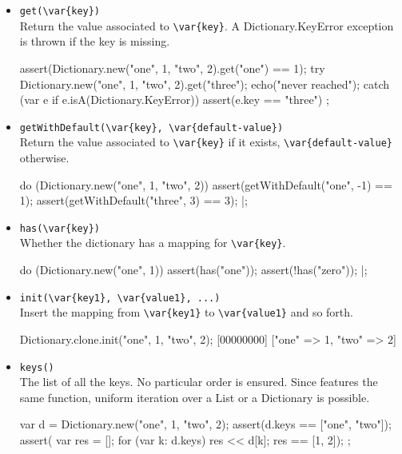 \begin{itemize}
\item \lstinline|get(\var{key})|\\
  Return the value associated to \lstinline|\var{key}|.  A
  Dictionary.KeyError exception is thrown if the key is missing.

\begin{urbiscript}
assert(Dictionary.new("one", 1, "two", 2).get("one") == 1);
try
{
  Dictionary.new("one", 1, "two", 2).get("three");
  echo("never reached");
}
catch (var e if e.isA(Dictionary.KeyError))
{
  assert(e.key == "three")
};
\end{urbiscript}


\item \lstinline|getWithDefault(\var{key}, \var{default-value})|\\
  Return the value associated to  \lstinline|\var{key}| if it exists,
  \lstinline|\var{default-value}| otherwise.

\begin{urbiscript}
do (Dictionary.new("one", 1, "two", 2))
{
  assert(getWithDefault("one",  -1) == 1);
  assert(getWithDefault("three", 3) == 3);
}|;
\end{urbiscript}


\item \lstinline|has(\var{key})|\\
  Whether the dictionary has a mapping for \lstinline|\var{key}|.

\begin{urbiscript}
do (Dictionary.new("one", 1))
{
  assert(has("one"));
  assert(!has("zero"));
}|;
\end{urbiscript}

\item \lstinline|init(\var{key1}, \var{value1}, ...)|~\\
  Insert the mapping from \lstinline|\var{key1}| to
  \lstinline|\var{value1}| and so forth.

\begin{urbiscript}
Dictionary.clone.init("one", 1, "two", 2);
[00000000] ["one" => 1, "two" => 2]
\end{urbiscript}

\item \lstinline|keys()|\\
  The list of all the keys.  No particular order is ensured.  Since
   features the same function, uniform iteration over
  a List or a Dictionary is possible.
\begin{urbiscript}
{
  var d = Dictionary.new("one", 1, "two", 2);
  assert(d.keys == ["one", "two"]);
  assert({
           var res = [];
           for (var k: d.keys)
             res << d[k];
           res
         }
         == [1, 2]);
};
\end{urbiscript}


\end{itemize}

